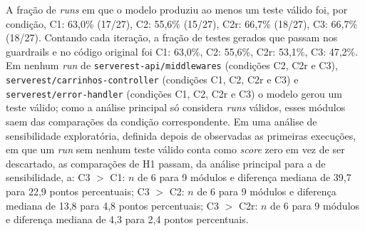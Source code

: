 A fração de \textit{runs} em que o modelo produziu ao menos um teste válido foi, por condição, C1: 63,0\% (17/27), C2: 55,6\% (15/27), C2r: 66,7\% (18/27), C3: 66,7\% (18/27). Contando cada iteração, a fração de testes gerados que passam nos guardrails e no código original foi C1: 63,0\%, C2: 55,6\%, C2r: 53,1\%, C3: 47,2\%. Em nenhum \textit{run} de \texttt{serverest-api/middlewares} (condições C2, C2r e C3), \texttt{serverest/carrinhos-controller} (condições C1, C2, C2r e C3) e \texttt{serverest/error-handler} (condições C1, C2, C2r e C3) o modelo gerou um teste válido; como a análise principal só considera \textit{runs} válidos, esses módulos saem das comparações da condição correspondente. Em uma análise de sensibilidade exploratória, definida depois de observadas as primeiras execuções, em que um \textit{run} sem nenhum teste válido conta como \textit{score} zero em vez de ser descartado, as comparações de H1 passam, da análise principal para a de sensibilidade, a: C3 $>$ C1: $n$ de 6 para 9 módulos e diferença mediana de 39,7 para 22,9 pontos percentuais; C3 $>$ C2: $n$ de 6 para 9 módulos e diferença mediana de 13,8 para 4,8 pontos percentuais; C3 $>$ C2r: $n$ de 6 para 9 módulos e diferença mediana de 4,3 para 2,4 pontos percentuais.
